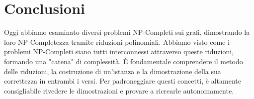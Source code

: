\documentclass[a4paper]{article}
\theoremstyle{definition} %
\begin{document}
\section{Conclusioni}
Oggi abbiamo esaminato diversi problemi NP-Completi sui grafi, dimostrando la loro NP-Completezza tramite riduzioni polinomiali. Abbiamo visto come i problemi NP-Completi siano tutti interconnessi attraverso queste riduzioni, formando una "catena" di complessità. È fondamentale comprendere il metodo delle riduzioni, la costruzione di un'istanza e la dimostrazione della sua correttezza in entrambi i versi. Per padroneggiare questi concetti, è altamente consigliabile rivedere le dimostrazioni e provare a ricrearle autonomamente.
\end{document}
